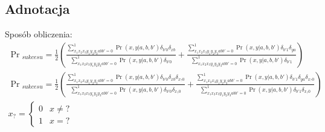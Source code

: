 \documentclass[10pt]{article} %
\begin{document}
 \subsection{Adnotacja}
Sposób obliczenia:
\begin{gather}
\Pr{}_{sukcesu} = \frac{1}{2}\left(\frac{\sum_{x_1x_2x_3y_1y_2y_3abb'=0}^1\Pr(x,y|a,b,b')\delta_{b'0}\delta_{xb}}{\sum_{x_1x_2x_3y_1y_2y_3abb'=0}^1\Pr(x,y|a,b,b')\delta_{b'0}}+\frac{\sum_{x_1x_2x_3y_1y_2y_3abb'=0}^1\Pr(x,y|a,b,b')\delta_{b'1}\delta_{ya}}{\sum_{x_1x_2x_3y_1y_2y_3abb'=0}^1\Pr(x,y|a,b,b')\delta_{b'1}}\right) \\
\Pr{}_{sukcesu} = \frac{1}{2}\left(\frac{\sum_{x_1x_2x_3y_1y_2y_3abb'=0}^1\Pr(x,y|a,b,b')\delta_{b'0}\delta_{xb}\delta_{x_?0}}{\sum_{x_1x_2x_3y_1y_2y_3abb'=0}^1\Pr(x,y|a,b,b')\delta_{b'0}\delta_{x_?0}}+\frac{\sum_{x_1x_2x_3y_1y_2y_3abb'=0}^1\Pr(x,y|a,b,b')\delta_{b'1}\delta_{ya}\delta_{x_?0}}{\sum_{x_1x_2x_3y_1y_2y_3abb'=0}^1\Pr(x,y|a,b,b')\delta_{b'1}\delta_{x_?0}}\right) \\
x_? = \begin{cases}
0&x\neq ?\\
1&x = ?
\end{cases}
\end{gather}
\end{document}
